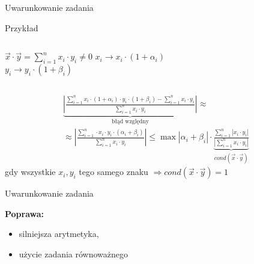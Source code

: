 \begin{frame}{Uwarunkowanie zadania}
	\begin{exampleblock}{Przykład}
    \begin{columns}
        	\centering
            $\vec{x} \cdot \vec{y} = \sum_{i=1}^n x_i \cdot y_i \neq 0$
                $x_i \rightarrow x_i \cdot (1 + \alpha_i)$ \\
                $y_i \rightarrow y_i \cdot (1 + \beta_i)$
    \end{columns}
    \begin{gather*}
    	\underbrace{\left| \frac{
        	\sum_{i=1}^n x_i \cdot (1 + \alpha_i) \cdot y_i \cdot (1 + \beta_i) - \sum_{i=1}^n x_i \cdot y_i
        }{
        	\sum_{i=1}^n x_i \cdot y_i
        }\right|}_\text{błąd względny}
        \approx \\ \approx
        \left| \frac{
        	\sum_{i=1}^n \cdot x_i \cdot y_i \cdot \left( \alpha_i + \beta_i \right)
        }{
        	\sum_{i=1}^n x_i \cdot y_i
        }\right|
        \le
        \max \left| \alpha_i + \beta_i \right| \cdot \underbrace{\frac{
        	\sum_{i=1}^n \left| x_i \cdot y_i \right|
        }{
        	\left| \sum_{i=1}^n x_i \cdot y_i \right|
        }}_{cond(\vec{x} \cdot \vec{y})}
    \end{gather*}
    gdy wszystkie $x_i, y_i$ tego samego znaku $\Rightarrow cond(\vec{x} \cdot \vec{y}) = 1$
    \end{exampleblock}
\end{frame}
\begin{frame}{Uwarunkowanie zadania}

	{\bf Poprawa:}
    \begin{itemize}
    	\item silniejsza arytmetyka,
        \item użycie zadania równoważnego
    \end{itemize}
\end{frame}
